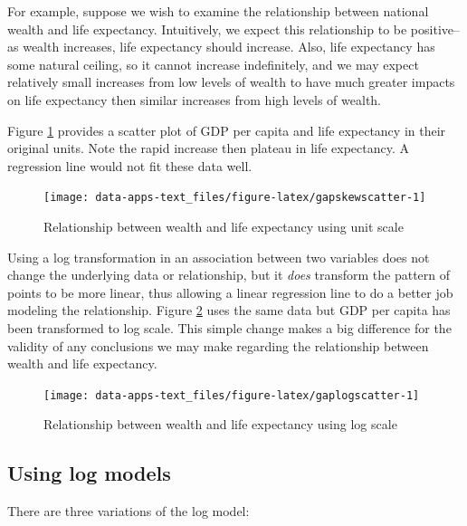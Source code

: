 \documentclass[
]{book}
\begin{document}
For example, suppose we wish to examine the relationship between national wealth and life expectancy. Intuitively, we expect this relationship to be positive--as wealth increases, life expectancy should increase. Also, life expectancy has some natural ceiling, so it cannot increase indefinitely, and we may expect relatively small increases from low levels of wealth to have much greater impacts on life expectancy then similar increases from high levels of wealth.

Figure \ref{fig:gapskewscatter} provides a scatter plot of GDP per capita and life expectancy in their original units. Note the rapid increase then plateau in life expectancy. A regression line would not fit these data well.

\begin{figure}

{\centering \texttt{[image: data-apps-text\_files/figure-latex/gapskewscatter-1]} 

}

\caption{Relationship between wealth and life expectancy using unit scale}\label{fig:gapskewscatter}
\end{figure}

Using a log transformation in an association between two variables does not change the underlying data or relationship, but it \emph{does} transform the pattern of points to be more linear, thus allowing a linear regression line to do a better job modeling the relationship. Figure \ref{fig:gaplogscatter} uses the same data but GDP per capita has been transformed to log scale. This simple change makes a big difference for the validity of any conclusions we may make regarding the relationship between wealth and life expectancy.

\begin{figure}

{\centering \texttt{[image: data-apps-text\_files/figure-latex/gaplogscatter-1]} 

}

\caption{Relationship between wealth and life expectancy using log scale}\label{fig:gaplogscatter}
\end{figure}

\hypertarget{using-log-models}{%
\subsection{Using log models}\label{using-log-models}}

There are three variations of the log model:
\end{document}

